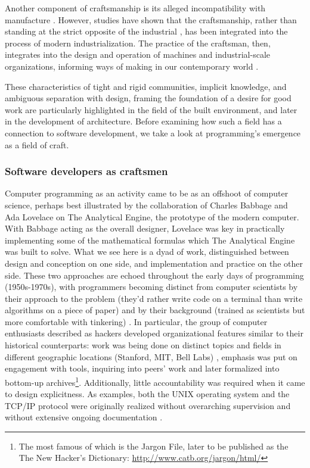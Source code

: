 Another component of craftsmanship is its alleged incompatibility with manufacture \citep{ruskin_seven_1920,sturt_wheelwright_1963}. However, studies have shown that the craftsmanship, rather than standing at the strict opposite of the industrial \citep{jones_reckoning_2016}, has been integrated into the process of modern industrialization. The practice of the craftsman, then, integrates into the design and operation of machines and industrial-scale organizations, informing ways of making in our contemporary world \citep{gordon_who_1988,mcgee_craftsmanship_1999}.

These characteristics of tight and rigid communities, implicit knowledge, and ambiguous separation with design, framing the foundation of a desire for good work are particularly highlighted in the field of the built environment, and later in the development of architecture. Before examining how such a field has a connection to software development, we take a look at programming's emergence as a field of craft.

\subsubsection{Software developers as craftsmen}

Computer programming as an activity came to be as an offshoot of computer science, perhaps best illustrated by the collaboration of Charles Babbage and Ada Lovelace on The Analytical Engine, the prototype of the modern computer. With Babbage acting as the overall designer, Lovelace was key in practically implementing some of the mathematical formulas which The Analytical Engine was built to solve. What we see here is a dyad of work, distinguished between design and conception on one side, and implementation and practice on the other side. These two approaches are echoed throughout the early days of programming (1950s-1970s), with programmers becoming distinct from computer scientists by their approach to the problem (they'd rather write code on a terminal than write algorithms on a piece of paper) and by their background (trained as scientists but more comfortable with tinkering) \citep{ensmenger_computer_2012}. In particular, the group of computer enthusiasts described as hackers developed organizational features similar to their historical counterparts: work was being done on distinct topics and fields in different geographic locations (Stanford, MIT, Bell Labs) \citep{raymond_cathedral_2001}, emphasis was put on engagement with tools, inquiring into peers' work \citep{levy_hackers_2010} and later formalized into bottom-up archives\footnote{The most famous of which is the Jargon File, later to be published as the The New Hacker's Dictionary: \url{http://www.catb.org/jargon/html/}}. Additionally, little accountability was required when it came to design explicitness. As examples, both the UNIX operating system and the TCP/IP protocol were originally realized without overarching supervision and without extensive ongoing documentation \citep{seibel_coders_2009,raymond_cathedral_2001}.

